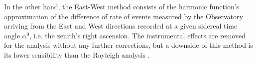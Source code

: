 \documentclass[12pt, doublespace, oneside]{article}
\begin{document}
In the other hand, the East-West method consists of the harmonic function's approximation of the difference of rate of events measured by the Observatory arriving from the East and West directions recorded at a given sidereal time angle $\alpha^0$, i.e. the zenith's right ascension. The instrumental effects are removed for the analysis without any further corrections, but a downside of this method is its lower sensibility than the Rayleigh analysis \cite{taborda}.

\end{document}
